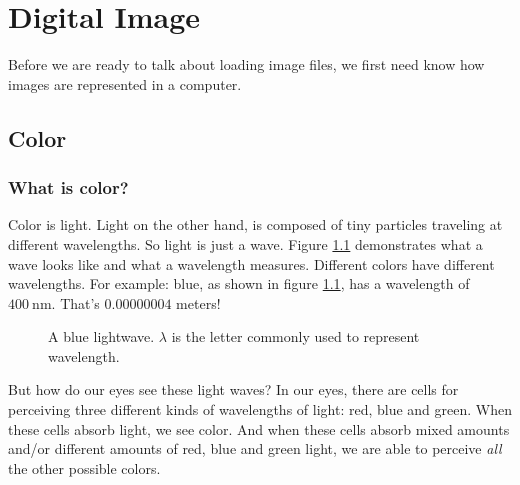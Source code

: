 \begin{comment}
  
\end{comment}

\chapter{Digital Image}
\label{cha:digital-image}

Before we are ready to talk about loading image files, we first need
know how images are represented in a computer.

\section{Color}
\label{sec:color}

\subsection{What is color?}
\label{sec:what-color}

\newcommand{\bluewave}{\ensuremath{\SI{400}{\nano\meter}}}

Color is light. Light on the other hand, is composed of tiny particles
traveling at different wavelengths. \cite{neider93:_openg_progr_guide}
So light is just a wave. Figure \ref{fig:wave} demonstrates what a
wave looks like and what a wavelength measures. Different colors have
different wavelengths. For example: blue, as shown in figure
\ref{fig:wave}, has a wavelength of
\bluewave. \cite{puglia00:_handbook_dig_proj} That's $0.00000004$
meters!

\begin{figure}[h!]
  \centering
  \caption{A blue lightwave. $\lambda$ is the letter commonly used to
    represent  wavelength.}
  \label{fig:wave}
\end{figure}

But how do our eyes see these light waves? In our eyes, there are
cells for perceiving three different kinds of wavelengths of light:
red, blue and green. When these cells absorb light, we see color. And
when these cells absorb mixed amounts and/or different amounts of red,
blue and green light, we are able to perceive \textit{all} the other
possible colors.

